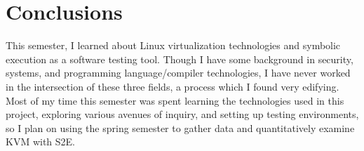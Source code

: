 \documentclass[11pt]{article}
\begin{document}
\section{Conclusions}
This semester, I learned about Linux virtualization technologies and symbolic
execution as a software testing tool. Though I have some background in security,
systems, and programming language/compiler technologies, I have never worked in
the intersection of these three fields, a process which I found very
edifying. Most of my time this semester was spent learning the
technologies used in this project, exploring various avenues of inquiry, and
setting up testing environments, so I plan on using the spring semester to
gather data and quantitatively examine KVM with S2E.

 
\end{document}
